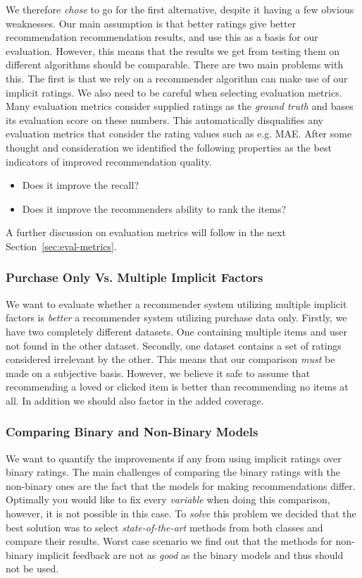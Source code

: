 We therefore \emph{chose} to go for the first alternative, despite it having a few obvious weaknesses.
Our main assumption is that better ratings give better recommendation recommendation results, and use this
as a basis for our evaluation. However, this means that the results we get from testing them
on different algorithms should be comparable. There are two main problems with this. The first is that
we rely on a recommender algorithm can make use of our implicit ratings. We also need to be careful
when selecting evaluation metrics. Many evaluation metrics consider supplied ratings as the \emph{ground truth}
and bases its evaluation score on these numbers. This automatically disqualifies any evaluation metrics
that consider the rating values such as e.g. MAE. After some thought and consideration
we identified the following properties as the best indicators of improved recommendation quality.

\begin{itemize}
\item Does it improve the recall?
\item Does it improve the recommenders ability to rank the items?
\end{itemize}

A further discussion on evaluation metrics will follow in the next Section~\ref{sec:eval-metrics}.

\subsubsection{Purchase Only Vs. Multiple Implicit Factors}

We want to evaluate whether a recommender system utilizing multiple implicit factors is \emph{better}
a recommender system utilizing purchase data only. Firstly, we have two completely different datasets.
One containing multiple items and user not found in the other dataset. Secondly, one dataset
contains a set of ratings considered irrelevant by the other. This means that our comparison
\emph{must} be made on a subjective basis. However, we believe it safe to assume that recommending
a loved or clicked item is better than recommending no items at all. In addition we should also
factor in the added coverage.

\subsubsection{Comparing Binary and Non-Binary Models}

We want to quantify the improvements if any from using implicit ratings over binary ratings.
The main challenges of comparing the binary ratings with the non-binary ones are the fact
that the models for making recommendations differ. Optimally you would like to fix every
\emph{variable} when doing this comparison, however, it is not possible in this case.
To \emph{solve} this problem we decided that the best solution was to select \emph{state-of-the-art}
methods from both classes and compare their results. Worst case scenario we find out that the
methods for non-binary implicit feedback are not as \emph{good} as the binary models and thus
should not be used.

